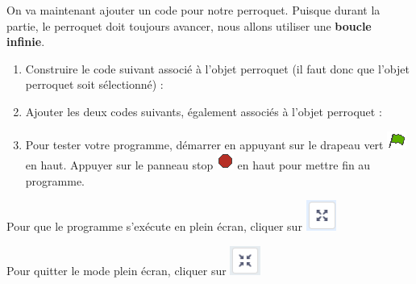 On va maintenant ajouter un code pour notre perroquet. Puisque durant la partie, le perroquet doit toujours avancer, nous allons utiliser une \textbf{boucle infinie}.

\vspace{12pt}


\vspace{12pt}



\begin{enumerate}
\item Construire le code suivant associé à l'objet perroquet (il faut donc que l'objet perroquet soit sélectionné) :
\item Ajouter les deux codes suivants, également associés à l'objet perroquet :
\item Pour tester votre programme, démarrer en appuyant sur le drapeau vert \includegraphics[width=.7cm]{./images/scratch/DrapeauVert} en haut. Appuyer sur le panneau stop \includegraphics[width=.7cm]{./images/scratch/Stop} en haut pour mettre fin au programme.
\end{enumerate}

Pour que le programme s'exécute en plein écran, cliquer sur \includegraphics[width=1cm]{./images/scratch/pleinEcran.png}

Pour quitter le mode plein écran, cliquer sur \includegraphics[width=1cm]{./images/scratch/quitterPleinEcran.png}

